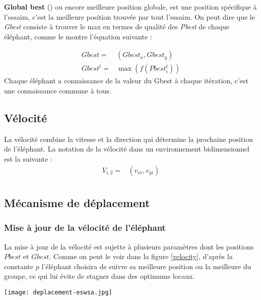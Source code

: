 \textbf{Global best} (\label{Gbest}) ou encore meilleure position globale, est une position spécifique à l'essaim, c'est la meilleure position trouvée par tout l'essaim. 
On peut dire que le \textit{Gbest} consiste à trouver le max en termes de qualité des \textit{Pbest} de chaque éléphant, comme le montre l'équation suivante :

\begin{equation}
\begin{split}
Gbest= &(Gbest_{x},Gbest_{y})\\
Gbest^{t} = & \max(f(Pbest^{t}_{i}))
\end{split}
\end{equation}
Chaque éléphant a connaissance de la valeur du Gbest à chaque itération, c'est une connaissance commune à tous.

\subsection{Vélocité}
La vélocité combine la vitesse et la direction qui détermine la prochaine position de l'éléphant. La notation de la vélocité dans un environnement bidimensionnel est la suivante :
\begin{equation}
\begin{split}
V_{i,2}= & (v_{xi},v_{yi})\\
\end{split}
\end{equation}

\subsection{Mécanisme de déplacement}
\subsubsection{Mise à jour de la vélocité de l'éléphant}
La mise à jour de la vélocité est sujette à plusieurs paramètres dont les positions $Pbest$ et $Gbest$. Comme on peut le voir dans la figure \ref{velocity}, d'après la constante $p$ l'éléphant choisira de suivre sa meilleure position ou la meilleure du groupe, ce qui lui évite de stagner dans des optimums locaux.

\noindent
\begin{center}	  
	\texttt{[image: deplacement-eswsa.jpg]}%
	\vspace{-0.1 cm}
	\label{velocity}%
\end{center}

